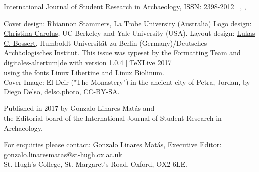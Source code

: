 \IJSRAtitlepage
\clearpage
\mypagesize
\thispagestyle{empty}

\vfill

\begin{footnotesize}

\noindent International Journal of Student Research in Archaeology,\newline
ISSN: 2398-2012\newline
\IJSRAmonth\ \IJSRAyear , \IJSRAvolume , \IJSRAnumber\\
\vspace{2em}


\noindent Cover design: \href{https://latrobe.academia.edu/RhiannonStammers}{Rhiannon Stammers}, La Trobe University (Australia)\newline
\noindent Logo design: \href{https://hraf.yale.edu/about/staff/christina-carolus/}{Christina Carolus}, UC-Berkeley and Yale University (USA).\newline
\noindent Layout design: \href{https://dainst.academia.edu/LukasCBossert}{Lukas C. Bossert}, Humboldt-Universität zu Berlin (Germany)/Deutsches Archäologisches Institut. \newline \indent This issue was typeset by the Formatting Team and \href{www.digitales-altertum.de}{digitales-altertum|de}  with  version 1.0.4 | \TeX Live 2017 \\ \indent using the fonts Linux Libertine and {\sffamily Linux Biolinum}.\\
Cover Image: 
El Deir ("The Monastery") in the ancient city of Petra, Jordan, by Diego Delso, delso.photo, CC-BY-SA.\\
\vspace{2em}

\noindent Published in 2017 by Gonzalo Linares Matás and \\ the Editorial board of the International Journal of Student Research in Archaeology. 




\vspace{2em}






\noindent For enquiries please contact: Gonzalo Linares Matás, Executive Editor:\\ \href{mailto:gonzalo.linaresmatas@st-hugh.ox.ac.uk}{gonzalo.linaresmatas@st-hugh.ox.ac.uk}\\  St. Hugh’s College, St. Margaret’s Road, Oxford, OX2 6LE.


\end{footnotesize}
